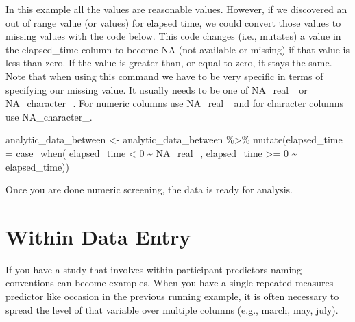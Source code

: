 \documentclass[
]{krantz}
\makeatletter
\newenvironment{Shaded}{\begin{snugshade}}{\end{snugshade}}
\newcommand{\AttributeTok}[1]{\textcolor[rgb]{0.61,0.61,0.61}{#1}}
\newcommand{\ConstantTok}[1]{\textcolor[rgb]{0,0,0}{#1}}
\newcommand{\DecValTok}[1]{\textcolor[rgb]{0.06,0.06,0.06}{#1}}
\newcommand{\FunctionTok}[1]{\textcolor[rgb]{0,0,0}{#1}}
\newcommand{\NormalTok}[1]{#1}
\newcommand{\OtherTok}[1]{\textcolor[rgb]{0.37,0.37,0.37}{#1}}
\newcommand{\SpecialCharTok}[1]{\textcolor[rgb]{0,0,0}{#1}}
\newenvironment{kframe}{%
\medskip{}
\setlength{\fboxsep}{.8em}
 \def\at@end@of@kframe{}%
 \ifinner\ifhmode%
  \def\at@end@of@kframe{\end{minipage}}%
  \begin{minipage}{\columnwidth}%
 \fi\fi%
 \def\FrameCommand##1{\hskip\@totalleftmargin \hskip-\fboxsep
 \colorbox{shadecolor}{##1}\hskip-\fboxsep
     \hskip-\linewidth \hskip-\@totalleftmargin \hskip\columnwidth}%
 \MakeFramed {\advance\hsize-\width
   \@totalleftmargin\z@ \linewidth\hsize
   \@setminipage}}%
 {\par\unskip\endMakeFramed%
 \at@end@of@kframe}
\renewenvironment{Shaded}{\begin{kframe}}{\end{kframe}}
\makeatother
\begin{document}
In this example all the values are reasonable values. However, if we discovered an out of range value (or values) for elapsed time, we could convert those values to missing values with the code below. This code changes (i.e., mutates) a value in the elapsed\_time column to become NA (not available or missing) if that value is less than zero. If the value is greater than, or equal to zero, it stays the same. Note that when using this command we have to be very specific in terms of specifying our missing value. It usually needs to be one of NA\_real\_ or NA\_character\_. For numeric columns use NA\_real\_ and for character columns use NA\_character\_.

\begin{Shaded}
\begin{Highlighting}[]
\NormalTok{analytic\_data\_between }\OtherTok{\textless{}{-}}\NormalTok{ analytic\_data\_between  }\SpecialCharTok{\%\textgreater{}\%} 
    \FunctionTok{mutate}\NormalTok{(}\AttributeTok{elapsed\_time =} \FunctionTok{case\_when}\NormalTok{(}
\NormalTok{      elapsed\_time }\SpecialCharTok{\textless{}} \DecValTok{0} \SpecialCharTok{\textasciitilde{}} \ConstantTok{NA\_real\_}\NormalTok{,}
\NormalTok{      elapsed\_time }\SpecialCharTok{\textgreater{}=} \DecValTok{0} \SpecialCharTok{\textasciitilde{}}\NormalTok{ elapsed\_time))}
\end{Highlighting}
\end{Shaded}

Once you are done numeric screening, the data is ready for analysis.

\hypertarget{within-data-entry}{%
\section{Within Data Entry}\label{within-data-entry}}

If you have a study that involves within-participant predictors naming conventions can become examples. When you have a single repeated measures predictor like occasion in the previous running example, it is often necessary to spread the level of that variable over multiple columns (e.g., march, may, july).
\end{document}
